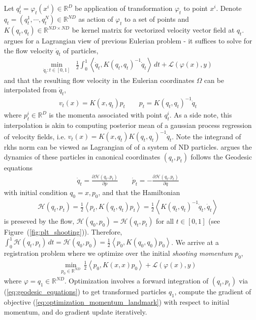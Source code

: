 \documentclass{6838publ}
\newcommand\sH{\ensuremath{\mathcal{H}}}
\newcommand\sL{\ensuremath{\mathcal{L}}}
\newcommand\R{\ensuremath{\mathbb{R}}} %
\newcommand\inner[2]{\ensuremath{\left< #1, #2 \right>}} %
\begin{document}
Let $q_t^i = \varphi_t(x^i) \in \R^D$ be application of transformation $\varphi_t$ to point $x^i$. Denote $q_t = (q_t^1, \cdots, q_t^N) \in \R^{ND}$ as action of $\varphi_t$ to a set of points and $K(q_t,q_t) \in \R^{ND\times ND}$ be kernel matrix for vectorized velocity vector field at $q_t$. \cite{joshiLandmarkMatchingLarge2000} argues for a Lagrangian view of previous Eulerian problem - it suffices to solve for the flow velocity $\dot{q}_t$ of particles,
\begin{align}
    \min_{\dot{q}_t:t\in [0,1]}
        &\frac{1}{2} \int_0^1 \inner{\dot{q}_t}{K(q_t,q_t)^{-1}\dot{q}_t} \, dt + \sL(\varphi(x),y)
\end{align}
and that the resulting flow velocity in the Eulerian coordinates $\Omega$ can be interpolated from $\dot{q}_t$,
\begin{align}
    v_t(x)
        = K(x, q_t) p_t
    \quad\quad
    p_t
        = K(q_t, q_t)^{-1} \dot{q}_t
\end{align}
where $p_t^i \in \R^{D}$ is the momenta associated with point $q_t^i$. As a side note, this interpolation is akin to computing posterior mean of a gaussian process regression of velocity fields, i.e. $v_t(x) = K(x,q_t) K(q_t,q_t)^{-1} \dot{q}_t$. Note the integrand of rkhs norm can be viewed as Lagrangian of of a system of ND particles. \cite{millerGeodesicShootingComputational2006} argues the dynamics of these particles in canonical coordinates $(q_t,p_t)$ follows the Geodesic equations
\begin{align}
    \dot{q}_t
        = \frac{\partial \sH(q_t,p_t)}{\partial p}
    \quad\quad
    \dot{p}_t
        = - \frac{\partial \sH(q_t,p_t)}{\partial q}
    \label{eq:geodesic_equations}
\end{align}
with initial condition $q_0 = x, p_0$, and that the Hamiltonian 
\begin{align}
    \sH(q_t,p_t) = \frac{1}{2}\inner{p_t}{K(q_t,q_t)p_t} = \frac{1}{2}\inner{K(q_t,q_t)^{-1}\dot{q}_t}{\dot{q}_t}  
\end{align}
is preseved by the flow, $\sH(q_0,p_0)  = \sH(q_t,p_t)$ for all $t\in [0,1]$ (see Figure~(\ref{fig:plt_shooting})). Therefore, $\int_0^1 \sH(q_t,p_t) \, dt = \sH(q_0, p_0) = \frac{1}{2} \inner{ p_0 }{ K(q_0,q_0) p_0 }$. We arrive at a registration problem where we optimize over the initial \textit{shooting momentum} $p_0$,
\begin{align}
    \min_{p_0\in\R^{ND}} \,
        \frac{1}{2} \inner{ p_0 }{ K(x,x) p_0 } + \sL(\varphi(x),y)
    \label{eq:optimization_momentum_landmark}
\end{align}
where $\varphi = q_1 \in \R^{ND}$. Optimization involves a forward integration of $(q_t,p_t)$ via (\ref{eq:geodesic_equations}) to get transformed particles $q_1$, compute the gradient of objective (\ref{eq:optimization_momentum_landmark}) with respect to initial momentum, and do gradient update iteratively. 
\end{document}
